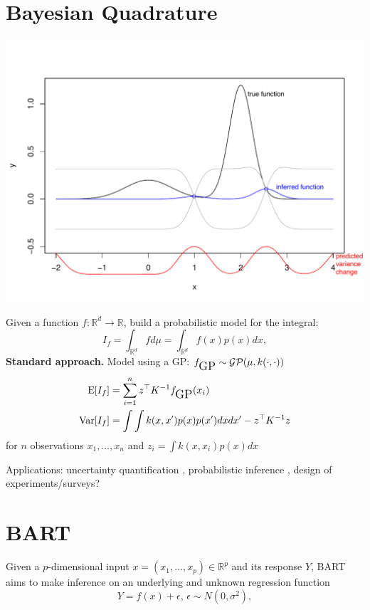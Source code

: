 \documentclass[a0,portrait]{a0poster}
\newcommand{\gp}{\mbox{\tiny GP}}
\begin{document}
\begin{multicols}{3}
\section*{Bayesian Quadrature}
\begin{center}\vspace{1cm}
\includegraphics[width=1\linewidth]{illustration-sbq-3}
\end{center}
Given a function $f:\mathbb{R}^d \rightarrow \mathbb{R}$, build a probabilistic model for the integral:
\begin{equation}
	I_f =\int_{\mathbb{R}^d} f d\mu = \int_{\mathbb{R}^d} f(x) p(x) dx,
\label{eq:integral}
\end{equation}
	{\bf Standard approach.} Model using a GP: $f_{\gp} \sim \mathcal{GP}(\mu, k(\cdot,\cdot))$ 
\begin{align}
	\mbox{E}[I_f] &= \sum_{i=1}^n z^{\top} K^{-1} f_{\gp}(x_i) \\
	\mbox{Var}[I_f] &= \int \int k(x,x') p(x)p(x') dx dx' - z^{\top}K^{-1}z
\end{align}
	for $n$ observations $x_1, \ldots, x_n$ and $z_i = \int k(x,x_i) p(x) dx$

	Applications: uncertainty quantification \cite{oates2019bayesian}, probabilistic inference \cite{gunter2014sampling}, design of experiments/surveys?


\section*{BART}
Given a $p$-dimensional input $x=(x_{1}, \ldots, x_{p})\in\mathbb{R}^p$ and its response $Y$, BART \cite{BART} aims to make inference on an underlying and unknown regression function
\begin{equation}
    Y = f(x) + \epsilon\text{, }\epsilon \sim N(0,\sigma^{2}),
\label{eq:underlying function}
\end{equation}


\end{multicols}
\end{document}
